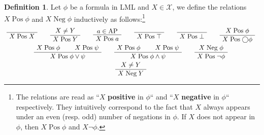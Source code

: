 \documentclass{tufte-handout} %
\theoremstyle{definition}
\newtheorem{defn}[thm]{Definition}
\theoremstyle{remark}
\newcommand{\0}{\textsf{0}}
\newcommand{\1}{\textsf{1}}
\newcommand{\mX}{\mathcal{X}}
\newcommand{\AP}{\text{AP}}
\newcommand{\Pos}{\mathrel{\text{Pos}}}
\newcommand{\Neg}{\mathrel{\text{Neg}}}
\newenvironment{bprooftree}
{\leavevmode\hbox\bgroup}
{\DisplayProof\egroup}
\begin{document}
\begin{defn}
	Let $\phi$ be a formula in LML and $X \in \mX$, we define the relations $X \Pos \phi$ and $X \Neg \phi$ inductively as follows:\footnote{The relations are read as ``$X$ \textbf{positive} in $\phi$`` and ``$X$ \textbf{negative} in $\phi$`` respectively. They intuitively correspond to the fact that $X$ always appears under an even (resp. odd) number of negations in $\phi$. If $X$ does not appear in $\phi$, then $X \Pos \phi$ and $X \neg \phi$.}
	{\small
		\begin{gather*}
			\begin{bprooftree}
			\AxiomC{}
			\RightLabel{}
			\UnaryInfC{$X \Pos X$}
			\end{bprooftree}\quad
			\begin{bprooftree}
			\AxiomC{$X \neq Y$}
			\RightLabel{}
			\UnaryInfC{$X \Pos Y$}
			\end{bprooftree}\quad
			\begin{bprooftree}
			\AxiomC{$a \in \AP$}
			\RightLabel{}
			\UnaryInfC{$X \Pos a$}
			\end{bprooftree}\quad
			\begin{bprooftree}
			\AxiomC{}
			\RightLabel{}
			\UnaryInfC{$X \Pos \top$}
			\end{bprooftree}\quad
			\begin{bprooftree}
			\AxiomC{}
			\RightLabel{}
			\UnaryInfC{$X \Pos \bot$}
			\end{bprooftree}\quad
			\begin{bprooftree}
			\AxiomC{$X \Pos \phi$}
			\RightLabel{}
			\UnaryInfC{$X \Pos \bigcirc\phi$}
			\end{bprooftree}\\
			\begin{bprooftree}
			\AxiomC{$X \Pos \phi$}
			\AxiomC{$X \Pos \psi$}
			\RightLabel{}
			\BinaryInfC{$X \Pos \phi \vee \psi$}
			\end{bprooftree}\quad	
			\begin{bprooftree}
			\AxiomC{$X \Pos \phi$}
			\AxiomC{$X \Pos \psi$}
			\RightLabel{}
			\BinaryInfC{$X \Pos \phi \wedge \psi$}
			\end{bprooftree}\quad
			\begin{bprooftree}
			\AxiomC{$X \Neg \phi$}
			\RightLabel{}
			\UnaryInfC{$X \Pos \neg\phi$}
			\end{bprooftree}\\
			\begin{bprooftree}
			\AxiomC{$X \neq Y$}
			\RightLabel{}
			\UnaryInfC{$X \Neg Y$}

\end{bprooftree}
\end{gather*}}
\end{defn}
\end{document}

